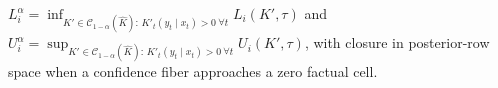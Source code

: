 \(L_i^{\alpha}=\inf_{K'\in\mathcal C_{1-\alpha}(\widehat K):\,K'_t(y_t\mid x_t)>0\ \forall t}L_i(K',\tau)\) and \(U_i^{\alpha}=\sup_{K'\in\mathcal C_{1-\alpha}(\widehat K):\,K'_t(y_t\mid x_t)>0\ \forall t}U_i(K',\tau)\), with closure in posterior-row space when a confidence fiber approaches a zero factual cell.